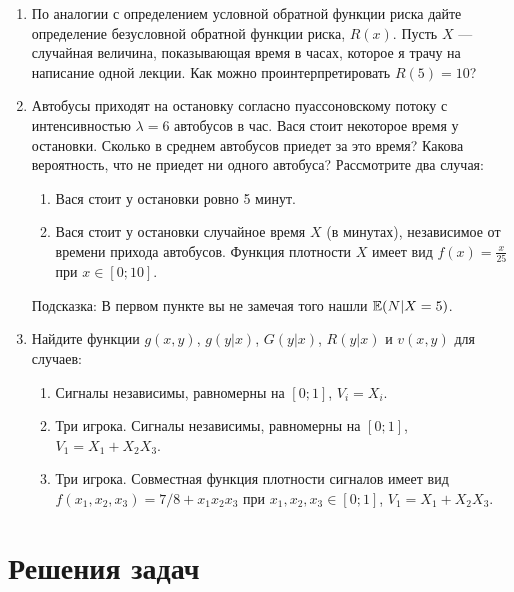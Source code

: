 \begin{enumerate}
\item По аналогии с определением условной обратной функции риска дайте определение безусловной обратной функции риска, $ R(x) $. Пусть $ X $ — случайная величина, показывающая время в часах, которое я трачу на написание одной лекции. Как можно проинтерпретировать $ R(5)=10 $?
\item Автобусы приходят на остановку согласно пуассоновскому потоку с интенсивностью $ \lambda=6 $ автобусов в час. Вася стоит некоторое время у остановки. Сколько в среднем автобусов приедет за это время? Какова вероятность, что не приедет ни одного автобуса? Рассмотрите два случая:
\begin{enumerate}
\item Вася стоит у остановки ровно 5 минут.
\item Вася стоит у остановки случайное время $ X $ (в минутах), независимое от времени прихода автобусов. Функция плотности $ X $ имеет вид $ f(x)= \frac{x}{25}$ при $ x\in [0;10] $.
\end{enumerate}
Подсказка: В первом пункте вы не замечая того нашли $ \mathbb{E}(N|X=5) $.
\item Найдите функции $ g(x,y)$, $ g(y|x)$, $ G(y|x)$,  $R(y|x)$ и $v(x,y)$ для случаев:
\label{ex_vxy}
\begin{enumerate}
\item Сигналы независимы, равномерны на $ [0;1] $, $ V_{i}=X_{i} $.
\item Три игрока. Сигналы независимы, равномерны на $ [0;1] $, $ V_{1}=X_{1}+X_{2}X_{3} $.
\item Три игрока. Совместная функция плотности сигналов имеет вид $ f(x_{1},x_{2},x_{3})=7/8+x_{1}x_{2}x_{3} $ при $ x_{1},x_{2},x_{3}\in[0;1] $, $ V_{1}=X_{1}+X_{2}X_{3} $.
\end{enumerate}
\end{enumerate}


\section{Решения задач}

